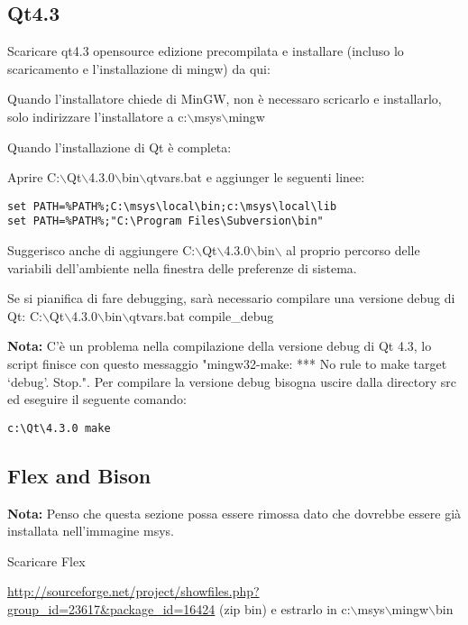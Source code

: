 \subsection{Qt4.3}
Scaricare qt4.3 opensource edizione precompilata e installare (incluso lo scaricamento e l'installazione di mingw) da qui:


Quando l'installatore chiede di MinGW, non è necessaro scricarlo e installarlo, solo indirizzare l'installatore a c:$\backslash$msys$\backslash$mingw

Quando l'installazione di Qt è completa:

Aprire C:$\backslash$Qt$\backslash$4.3.0$\backslash$bin$\backslash$qtvars.bat e aggiunger le seguenti linee:

\begin{verbatim}
set PATH=%PATH%;C:\msys\local\bin;c:\msys\local\lib 
set PATH=%PATH%;"C:\Program Files\Subversion\bin" 
\end{verbatim}

Suggerisco anche di aggiungere C:$\backslash$Qt$\backslash$4.3.0$\backslash$bin$\backslash$ al proprio percorso delle variabili dell'ambiente nella finestra delle preferenze di sistema.

Se si pianifica di fare debugging, sarà necessario compilare una versione debug di Qt:
C:$\backslash$Qt$\backslash$4.3.0$\backslash$bin$\backslash$qtvars.bat compile\_debug

\textbf{Nota:} C'è un problema nella compilazione della versione debug di Qt 4.3, lo script finisce con questo messaggio  "mingw32-make: *** No rule to make target `debug'.  Stop.". Per compilare la versione debug bisogna uscire dalla directory src ed eseguire il seguente comando:

\begin{verbatim}
c:\Qt\4.3.0 make 
\end{verbatim}

\subsection{Flex and Bison}
\textbf{Nota:} Penso che questa sezione possa essere rimossa dato che dovrebbe essere già installata nell'immagine msys.

Scaricare Flex

\url{http://sourceforge.net/project/showfiles.php?group\_id=23617&package\_id=16424} (zip bin) e estrarlo in c:$\backslash$msys$\backslash$mingw$\backslash$bin

